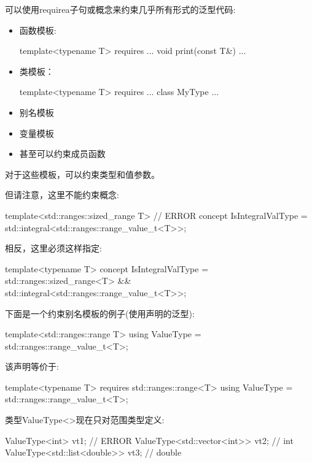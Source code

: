 

可以使用requirea子句或概念来约束几乎所有形式的泛型代码:

\begin{itemize}
\item
函数模板:
\begin{cpp}
template<typename T>
requires ...
void print(const T&) {
	...
}
\end{cpp}

\item
类模板：
\begin{cpp}
template<typename T>
requires ...
class MyType {
	...
}
\end{cpp}

\item
别名模板

\item
变量模板

\item
甚至可以约束成员函数
\end{itemize}

对于这些模板，可以约束类型和值参数。

但请注意，这里不能约束概念:

\begin{cpp}
template<std::ranges::sized_range T> // ERROR
concept IsIntegralValType = std::integral<std::ranges::range_value_t<T>>;
\end{cpp}

相反，这里必须这样指定:

\begin{cpp}
template<typename T>
concept IsIntegralValType = std::ranges::sized_range<T> &&
							std::integral<std::ranges::range_value_t<T>>;
\end{cpp}



下面是一个约束别名模板的例子(使用声明的泛型):

\begin{cpp}
template<std::ranges::range T>
using ValueType = std::ranges::range_value_t<T>;
\end{cpp}

该声明等价于:

\begin{cpp}
template<typename T>
requires std::ranges::range<T>
using ValueType = std::ranges::range_value_t<T>;
\end{cpp}

类型ValueType<>现在只对范围类型定义:

\begin{cpp}
ValueType<int> vt1; // ERROR
ValueType<std::vector<int>> vt2; // int
ValueType<std::list<double>> vt3; // double
\end{cpp}


